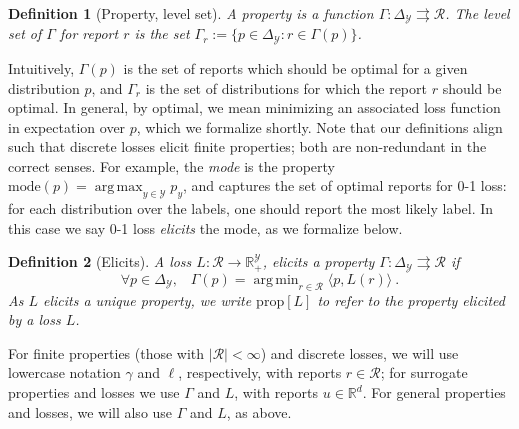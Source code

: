 \documentclass[12pt]{article}
\newcommand{\Comments}{1}
\newcommand{\mytodo}[2]{\ifnum\Comments=1%
  \todo[linecolor=#1!80!black,backgroundcolor=#1,bordercolor=#1!80!black]{#2}\fi}
\newcommand{\raft}[1]{\mytodo{green!20!white}{RF: #1}}
\newcommand{\jessiet}[1]{\mytodo{teal!20!white}{JF: #1}}
\newcommand{\reals}{\mathbb{R}}
\newcommand{\prop}[1]{\mathrm{prop}[#1]}
\newcommand{\mode}{\mathrm{mode}}
\newcommand{\simplex}{\Delta_\Y}
\newcommand{\R}{\mathcal{R}}
\newcommand{\Y}{\mathcal{Y}}
\newcommand{\inprod}[2]{\langle #1, #2 \rangle}%
\newcommand{\toto}{\rightrightarrows}
\DeclareMathOperator*{\argmax}{arg\,max}
\DeclareMathOperator*{\argmin}{arg\,min}
\newtheorem{definition}{Definition}
\begin{document}
\begin{definition}[Property, level set]\label{def:property}
  A \emph{property} is a function $\Gamma:\simplex\toto\R$.
  The \emph{level set} of $\Gamma$ for report $r$ is the set $\Gamma_r := \{p \in \simplex : r \in \Gamma(p)\}$.
\end{definition}

Intuitively, $\Gamma(p)$ is the set of reports which should be optimal for a given distribution $p$, and $\Gamma_r$ is the set of distributions for which the report $r$ should be optimal.
In general, by optimal, we mean minimizing an associated loss function in expectation over $p$, which we formalize shortly.
Note that our definitions align such that discrete losses elicit finite properties; both are non-redundant in the correct senses.
For example, the \emph{mode} is the %
property $\mode(p) = \argmax_{y\in\Y} p_y$, and captures the set of optimal reports for 0-1 loss: for each distribution over the labels, one should report the most likely label.
In this case we say 0-1 loss \emph{elicits} the mode, as we formalize below.

\begin{definition}[Elicits]
  \label{def:elicits}
  A loss $L:\R\to\reals^\Y_+$, \emph{elicits} a property $\Gamma:\simplex \toto \R$ if
  \begin{equation}
    \forall p\in\simplex,\;\;\;\Gamma(p) = \argmin_{r \in \R} \inprod{p}{L(r)}~.
  \end{equation}
  As $L$ elicits a unique property, we write $\prop{L}$ to refer to the property elicited by a loss $L$.
\end{definition}

For finite properties (those with $|\R|<\infty$) and discrete losses, we will use lowercase notation $\gamma$ and $\ell$, respectively, with reports $r\in\R$; for surrogate properties and losses we use $\Gamma$ and $L$, with reports $u\in\reals^d$.
For general properties and losses, we will also use $\Gamma$ and $L$, as above.
\end{document}
